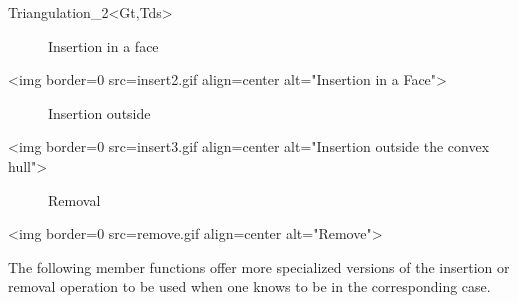 \begin{ccClassTemplate}{Triangulation_2<Gt,Tds>}
\begin{ccTexOnly}
  \begin{figure}
    \begin{center}
     
    \end{center}
    \caption{Insertion in a face}
    \label{I1_Fig_insert2}
  \end{figure}
\end{ccTexOnly}

\begin{ccHtmlOnly}
<img border=0 src=insert2.gif align=center alt="Insertion in a Face">
\end{ccHtmlOnly}


\begin{ccTexOnly}
  \begin{figure}
    \begin{center}
     
    \end{center}
     \caption{Insertion outside}
    \label{I1_Fig_insert3}
  \end{figure}
\end{ccTexOnly}

\begin{ccHtmlOnly}
<img border=0 src=insert3.gif align=center alt="Insertion outside the
convex hull">
\end{ccHtmlOnly}

\begin{ccTexOnly}
  \begin{figure}
    \begin{center}
     
    \end{center}
     \caption{Removal}
    \label{I1_Fig_remove}
  \end{figure}
\end{ccTexOnly}

\begin{ccHtmlOnly}
<img border=0 src=remove.gif align=center alt="Remove">
\end{ccHtmlOnly}


The following member functions offer more specialized versions of the
insertion or removal operation to be used when one knows to be in the
corresponding case.


\end{ccClassTemplate}
